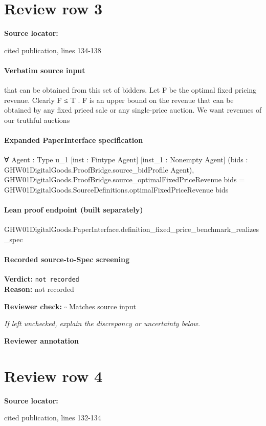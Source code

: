 \documentclass[10pt]{article}
\newcommand{\reviewerbox}{%
  \par\noindent\fbox{\parbox{0.96\linewidth}{\rule{0pt}{0.38in}}}\par
}
\newcommand{\reviewmatch}[1]{%
  \par\noindent\textbf{Reviewer check:} $\square$\; #1\par
  \noindent\emph{If left unchecked, explain the discrepancy or uncertainty below.}\par
}
\begin{document}
\section*{Review row 3}
\textbf{Source locator:} {\footnotesize\raggedright cited publication, lines 134-\allowbreak{}138\par}
\paragraph{Verbatim source input}
\begin{ReviewVerbatim}
that can be obtained from this set of bidders. Let F
be the optimal fixed pricing revenue. Clearly F ≤
T . F is an upper bound on the revenue that can be
obtained by any fixed priced sale or any single-price
auction. We want revenues of our truthful auctions
\end{ReviewVerbatim}


\paragraph{Expanded PaperInterface specification}
\begin{ReviewVerbatim}
∀ {Agent : Type u_1} [inst : Fintype Agent] [inst_1 : Nonempty Agent]
  (bids : GHW01DigitalGoods.ProofBridge.source_bidProfile Agent),
  GHW01DigitalGoods.ProofBridge.source_optimalFixedPriceRevenue bids =
    GHW01DigitalGoods.SourceDefinitions.optimalFixedPriceRevenue bids
\end{ReviewVerbatim}

\paragraph{Lean proof endpoint (built separately)}\begin{ReviewVerbatim}
GHW01DigitalGoods.PaperInterface.definition_fixed_price_benchmark_realizes_spec
\end{ReviewVerbatim}

\paragraph{Recorded source-to-Spec screening}
\textbf{Verdict:} \texttt{not recorded}
\\
\textbf{Reason:} not recorded
\reviewmatch{Matches source input}
\noindent\textbf{Reviewer annotation}\par
\reviewerbox
\clearpage
\hypertarget{source-claim-c629f252e7aba094}{}
\section*{Review row 4}
\textbf{Source locator:} {\footnotesize\raggedright cited publication, lines 132-\allowbreak{}134\par}
\end{document}
